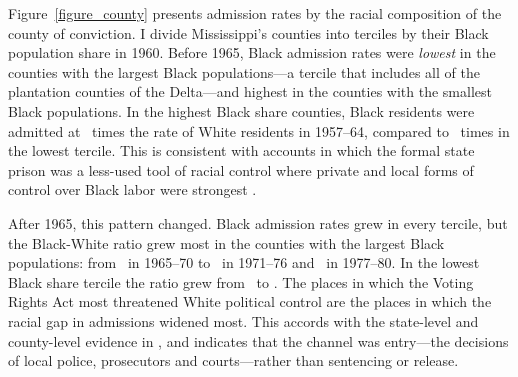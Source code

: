 \documentclass[12pt]{article}
\begin{document}
Figure~\ref{figure_county} presents admission rates by the racial composition of the county of conviction.  I divide Mississippi's counties into terciles by their Black population share in 1960.  Before 1965, Black admission rates were \emph{lowest} in the counties with the largest Black populations---a tercile that includes all of the plantation counties of the Delta---and highest in the counties with the smallest Black populations.  In the highest Black share counties, Black residents were admitted at \unskip~times the rate of White residents in 1957--64, compared to \unskip~times in the lowest tercile.  This is consistent with accounts in which the formal state prison was a less-used tool of racial control where private and local forms of control over Black labor were strongest \citep{Oshinsky:1997up,Muller:2019uv}.

After 1965, this pattern changed.  Black admission rates grew in every tercile, but the Black-White ratio grew most in the counties with the largest Black populations: from \unskip~in 1965--70 to \unskip~in 1971--76 and \unskip~in 1977--80.  In the lowest Black share tercile the ratio grew from \unskip~to \unskip.  The places in which the Voting Rights Act most threatened White political control are the places in which the racial gap in admissions widened most.  This accords with the state-level and county-level evidence in \cite{EubankFresh:2021gg}, and indicates that the channel was entry---the decisions of local police, prosecutors and courts---rather than sentencing or release.
\end{document}
